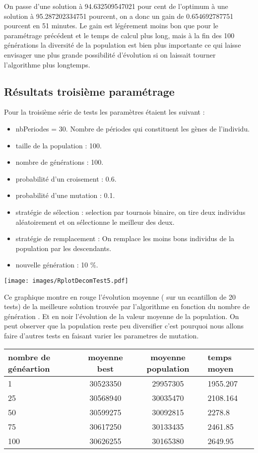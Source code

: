 \documentclass[a4paper]{report}
\begin{document}
On passe d'une solution à 94.632509547021 pour cent de l'optimum à une solution à 95.287202334751 pourcent, on a donc un gain de 0.654692787751 pourcent en 51 minutes. Le gain est légérement moins bon que pour le paramétrage précédent et le temps de calcul plus long, mais à la fin des 100 générations la diversité de la population est bien plus importante ce qui laisse envisager une plus grande possibilité d'évolution si on laissait tourner l'algorithme plus longtemps.
\subsection{Résultats troisième paramétrage}
Pour la troisième série de tests les paramètres étaient les suivant :\\

\begin{itemize}
\item nbPeriodes = 30. Nombre de périodes qui constituent les gènes de l'individu.
\item taille de la population : 100.
\item nombre de générations : 100.
\item probabilité d'un croisement : 0.6.
\item probabilité d'une mutation : 0.1.
\item stratégie de sélection : selection par tournois binaire, on tire deux individus aléatoirement et on sélectionne le meilleur des deux.
\item stratégie de remplacement : On remplace les moins bons individus de la population par les descendants.
\item nouvelle génération : 10 $\%$.

\end{itemize}
\begin{center}
\texttt{[image: images/RplotDecomTest5.pdf]}
\end{center}
Ce graphique montre  en rouge l'évolution moyenne ( sur un ecantillon de 20 tests) de la  meilleure solution trouvée par l'algorithme en fonction du nombre de génération . Et en noir l'évolution de la valeur moyenne de la population. On peut observer que la population reste peu diversifier c'est pourquoi nous allons faire d'autres tests en faisant varier les parametres de mutation.\\
\begin{tabular}{|l|c|c|l|}
  \hline
  nombre de généartion &moyenne best &moyenne population&temps moyen\\

  \hline
 1 &30523350&29957305&1955.207\\
  \hline
25 & 30568940 &30035470& 2108.164
\\
  \hline
  50& 30599275&30092815&2278.8
\\
  \hline
  75 &30617250&30133435&2461.85


\\
  \hline
 100 &  30626255&30165380& 2649.95 \\
  \hline


\end{tabular}
\end{document}
